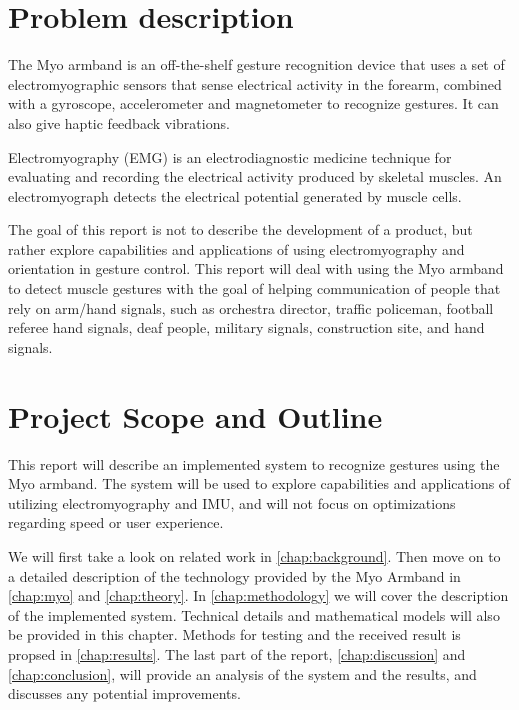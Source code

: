 \section{Problem description}
\label{sec:problem_description}
The Myo armband is an off-the-shelf gesture recognition device that uses a set of electromyographic sensors that sense electrical activity in the forearm, combined with a gyroscope, accelerometer and magnetometer to recognize gestures. It can also give haptic feedback vibrations.

\begin{sloppypar}
Electromyography (EMG) is an electrodiagnostic medicine technique for evaluating and recording the electrical activity produced by skeletal muscles. An electromyograph detects the electrical potential generated by muscle cells.
\end{sloppypar}

The goal of this report is not to describe the development of a product, but rather explore capabilities and applications of using electromyography and orientation in gesture control. This report will deal with using the Myo armband to detect muscle gestures with the goal of helping communication of people that rely on arm/hand signals, such as orchestra director, traffic policeman, football referee hand signals, deaf people, military signals, construction site, and hand signals.

\section{Project Scope and Outline}
\label{sec:project_scop_and_outline}
This report will describe an implemented system to recognize gestures using the Myo armband. The system will be used to explore capabilities and applications of utilizing electromyography and IMU, and will not focus on optimizations regarding speed or user experience. 

We will first take a look on related work in \cref{chap:background}. Then move on to a detailed description of the technology provided by the Myo Armband in \cref{chap:myo} and \ref{chap:theory}. In \cref{chap:methodology} we will cover the description of the implemented system. Technical details and mathematical models will also be provided in this chapter. Methods for testing and the received result is propsed in \cref{chap:results}. The last part of the report, \cref{chap:discussion} and \ref{chap:conclusion}, will provide an analysis of the system and the results, and discusses any potential improvements. 